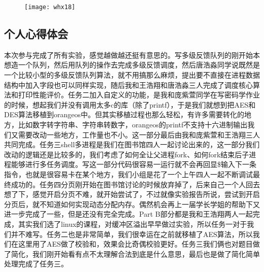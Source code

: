 \documentclass{whureport}
\begin{document}
\begin{figure}[H]
	\centering
	\texttt{[image: whx18]}
\end{figure}

\subsection{个人心得体会}
本次参与完成了所有实验，感觉越做越还挺有意思的。写多级反馈队列的刚开始本想造一个队列，然后用队列的操作去完成多级反馈调度，然后唐浩淼同学说既然是一个比较小型的多级反馈队列算法，就不用搞那么麻烦，提出要不直接在进程数据结构中加入字段也可以同样实现，随后我和王浩翔和唐浩淼三人完成了调度核心算法和打印性能评价。任务二加入自定义的功能，是我和庞紫萱同学在写密码学作业的时候，想起我们并没有调用太多c的库（除了printf），于是我们就想到把AES和DES算法移植到orangeos中。但其实移植过程也那么轻松，有许多需要转化的地方，比如数字转字符串、字符串转数字，orangeos的printf不支持十六进制输出我们又需要改动一些地方，工作量也不小。这一部分最后由我和庞紫萱和王浩翔三人共同完成。任务三shell多进程是我们在图书馆四人一起讨论出来的，这一部分我们改动的逻辑还是比较多的，我们考虑了如何全让父进程fork、如何fork结束后子进程能够进行多任务调度。写这一部分代码很容易一运行就不会再回显\$输入下一条指令，也就是很容易卡在某个地方，我们小组是花了一个上午四人一起不断调试最终成功的。任务四分页刚开始在图书馆讨论的时候放弃掉了，后来自己一个人回去想了下，感觉开启分页不难，就开始尝试了，不过就像实验报告所说，尝试到开启分页后，就不知道如何实现动态分配内存。偶然机会再上一届学长学姐的帮助下又进一步完成了一些，但是还没有完全完成。Part B部分都是我和王浩翔两人一起完成，其实我们选了linux的课程，对缓冲区溢出早早做过实验，所以任务一对于我们并不难写。任务二也是非常简单，我们很幸运在之前就移植了AES算法，所以我们在这里用了AES做了校验和，效果会比奇偶校验更好。任务三我们俩也对题目做了简化，我们刚开始看有点不太理解合法到底是什么意思，最后也是做了简化简单处理完成了任务三。


\newpage
\end{document}
